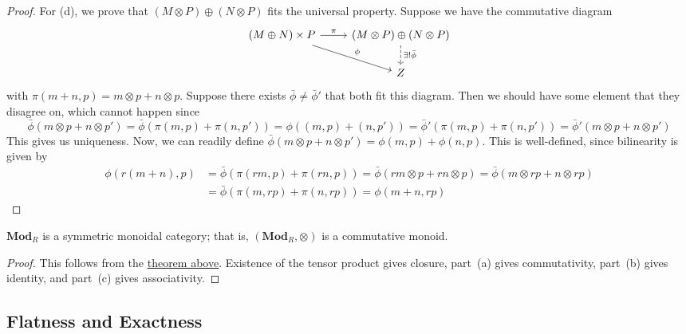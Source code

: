 \begin{proof}
    For (d), we prove that \((M \otimes P) \oplus (N \otimes P)\) fits the universal property.
    Suppose we have the commutative diagram
    \begin{equation*}
        \begin{tikzcd}
            (M \oplus N) \times P \arrow{r}{\pi} \arrow{rd}{\phi} &
            (M \otimes P) \oplus (N \otimes P) \arrow[dashrightarrow]{d}{\exists!\bar{\phi}} \\
            & Z
        \end{tikzcd}
    \end{equation*}
    with \(\pi(m+n,p) = m \otimes p + n \otimes p\).
    Suppose there exists \(\bar{\phi}\neq\bar{\phi}'\) that both fit this diagram.
    Then we should have some element that they disagree on,
    which cannot happen since
    \begin{equation*}
        \bar{\phi}(m \otimes p + n \otimes p')
        = \bar{\phi}(\pi(m,p)+\pi(n,p'))
        = \phi((m,p)+(n,p'))
        = \bar{\phi}'(\pi(m,p)+\pi(n,p'))
        = \bar{\phi}'(m \otimes p + n \otimes p')
    \end{equation*}
    This gives us uniqueness.
    Now, we can readily define \(\bar{\phi}(m \otimes p + n \otimes p') = \phi(m,p) + \phi(n,p)\).
    This is well-defined,
    since bilinearity is given by
    \begin{align*}
        \phi(r(m+n),p)
        &= \bar{\phi}(\pi(rm,p)+\pi(rn,p))
        =  \bar{\phi}(rm \otimes p + rn \otimes p)
        = \bar{\phi}(m \otimes rp + n \otimes rp) \\
        &= \bar{\phi}(\pi(m,rp)+\pi(n,rp))
        = \phi(m+n,rp)
    \end{align*}
\end{proof}
\begin{corollary}
    \(\textbf{Mod}_R\) is a symmetric monoidal category;
    that is, \((\textbf{Mod}_R,\otimes)\) is a commutative monoid.
\end{corollary}
\begin{proof}
    This follows from the \hyperref[thm:tensor-isomorphisms]{theorem above}.
    Existence of the tensor product gives closure,
    part~(a) gives commutativity,
    part~(b) gives identity,
    and part~(c) gives associativity.
\end{proof}

\subsection*{Flatness and Exactness}

